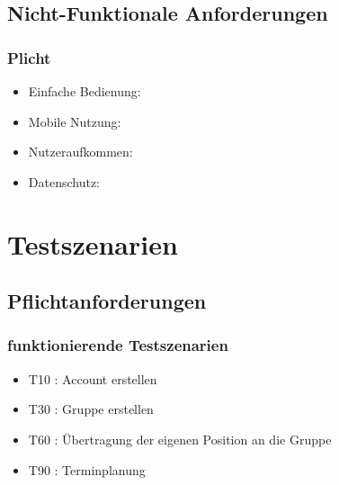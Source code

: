\documentclass[parskip=full,11pt]{scrartcl}
\begin{document}
	\subsection{Nicht-Funktionale Anforderungen}
		\subsubsection{Plicht}
			\begin{itemize}
				\item Einfache Bedienung:\\
				\item Mobile Nutzung:\\
				\item Nutzeraufkommen:\\
				\item Datenschutz:\\
			\end{itemize}

\section{Testszenarien}

	\subsection{Pflichtanforderungen}
		\subsubsection{funktionierende Testszenarien}
			\begin{itemize}
				\item T10 : Account erstellen
				\item T30 : Gruppe erstellen
				\item T60 : Übertragung der eigenen Position an die Gruppe
				\item T90 : Terminplanung
			\end{itemize}
\end{document}
